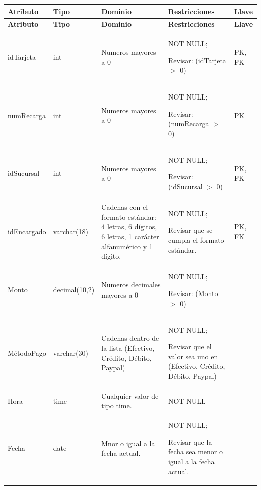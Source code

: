 \documentclass[12pt]{article}
\begin{document}
\begin{longtable}{p{2.2cm} p{2.2cm} p{5.8cm} p{4.2cm} p{1.2cm}}
\label{tab:recarga}\\
\toprule
\textbf{Atributo} & \textbf{Tipo} & \textbf{Dominio} & \textbf{Restricciones} & \textbf{Llave} \\
\midrule
\endfirsthead

\toprule
\textbf{Atributo} & \textbf{Tipo} & \textbf{Dominio} & \textbf{Restricciones} & \textbf{Llave} \\
\midrule
\endhead

\bottomrule
\endfoot


idTarjeta 
& int 
& Numeros mayores a 0
& NOT NULL;

Revisar: (idTarjeta $>$ 0)
& PK, FK \\

numRecarga 
& int 
& Numeros mayores a 0
& NOT NULL;

Revisar: (numRecarga $>$ 0)
& PK \\

idSucursal 
& int 
& Numeros mayores a 0
& NOT NULL;

Revisar: (idSucursal $>$ 0)
& PK, FK \\

idEncargado 
& varchar(18) 
& Cadenas con el formato estándar: 4 letras, 6 dígitos, 6 letras, 1 carácter alfanumérico y 1 dígito.
& NOT NULL;

Revisar que se cumpla el formato estándar.
& PK, FK \\

Monto 
& decimal(10,2) 
& Numeros decimales mayores a 0
& NOT NULL;

Revisar: (Monto $>$ 0)
&  \\

MétodoPago 
& varchar(30) 
& Cadenas dentro de la lista (Efectivo, Crédito, Débito, Paypal)
& NOT NULL;

Revisar que el valor sea uno en (Efectivo, Crédito, Débito, Paypal)
&  \\

Hora 
& time 
& Cualquier valor de tipo time.
& NOT NULL
&  \\

Fecha 
& date 
& Mnor o igual a la fecha actual.
& NOT NULL;

Revisar que la fecha sea menor o igual a la fecha actual.
&  \\

\end{longtable}
\end{document}

